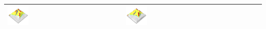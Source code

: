 \documentclass[prodmode,acmtochi]{acmsmall} %
\begin{document}
\begin{table}
{\begin{tabular}{m{} m{} m{} m{} m{}}
\includegraphics[width=0.19\textwidth]{images/render_3d/landscape_students/mean_forms_2.png} &
\includegraphics[width=0.19\textwidth]{images/render_3d/landscape_students/mean_forms_3.png}\\
%
\bottomrule
\end{tabular}}
\label{table:landscape_students} 

\vspace*{1.5em}


\end{table}
\end{document}
